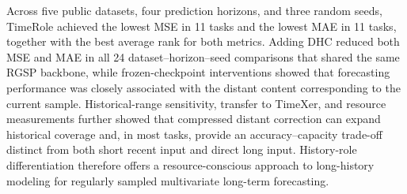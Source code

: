 Across five public datasets, four prediction horizons, and three random seeds, TimeRole achieved the lowest MSE in 11 tasks and the lowest MAE in 11 tasks, together with the best average rank for both metrics. Adding DHC reduced both MSE and MAE in all 24 dataset--horizon--seed comparisons that shared the same RGSP backbone, while frozen-checkpoint interventions showed that forecasting performance was closely associated with the distant content corresponding to the current sample. Historical-range sensitivity, transfer to TimeXer, and resource measurements further showed that compressed distant correction can expand historical coverage and, in most tasks, provide an accuracy--capacity trade-off distinct from both short recent input and direct long input. History-role differentiation therefore offers a resource-conscious approach to long-history modeling for regularly sampled multivariate long-term forecasting.
